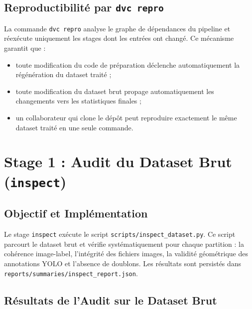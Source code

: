 \documentclass{rapportENSIAS}
\newcommand{\projectpath}[1]{\texttt{#1}}
\begin{document}
\subsection{Reproductibilité par \texttt{dvc repro}}

La commande \texttt{dvc repro} analyse le graphe de dépendances du pipeline et
réexécute uniquement les stages dont les entrées ont changé. Ce mécanisme garantit
que :

\begin{itemize}
    \item toute modification du code de préparation déclenche automatiquement
          la régénération du dataset traité ;
    \item toute modification du dataset brut propage automatiquement les changements
          vers les statistiques finales ;
    \item un collaborateur qui clone le dépôt peut reproduire exactement le même
          dataset traité en une seule commande.
\end{itemize}

\section{Stage 1 : Audit du Dataset Brut (\texttt{inspect})}

\subsection{Objectif et Implémentation}

Le stage \texttt{inspect} exécute le script \projectpath{scripts/inspect\_dataset.py}.
Ce script parcourt le dataset brut et vérifie systématiquement pour chaque partition :
la cohérence image-label, l'intégrité des fichiers images, la validité géométrique
des annotations YOLO et l'absence de doublons. Les résultats sont persistés dans
\projectpath{reports/summaries/inspect\_report.json}.

\subsection{Résultats de l'Audit sur le Dataset Brut}
\end{document}
